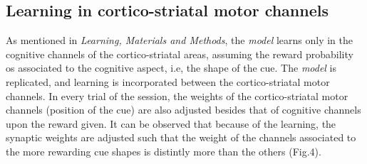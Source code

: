 \documentclass[11pt]{article}
\begin{document}
\subsection{Learning in cortico-striatal motor channels}
As mentioned in \emph{Learning, Materials and Methods}, the \emph{model} learns only in the cognitive channels of the cortico-striatal areas, assuming the reward probability os associated to the cognitive aspect, i.e, the shape of the cue. The \emph{model} is replicated, and learning is incorporated between the cortico-striatal motor channels. In every trial of the session, the weights of the cortico-striatal motor channels (position of the cue) are also adjusted besides that of cognitive channels upon the reward given. It can be observed that because of the learning, the synaptic weights are adjusted such that the weight of the channels associated to the more rewarding cue shapes is distintly more than the others (Fig.4).  \par
\end{document}
